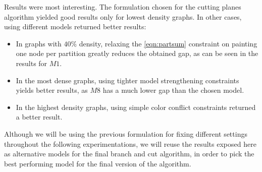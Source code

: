 Results were most interesting. The formulation chosen for the cutting planes algorithm yielded good results only for lowest density graphs. In other cases, using different models returned better results:
\begin{itemize}
\item In graphs with $40\%$ density, relaxing the \ref{eqn:partsum} constraint on painting one node per partition greatly reduces the obtained gap, as can be seen in the results for $M1$.
\item In the most dense graphs, using tighter model strengthening constraints yields better results, as $M8$ has a much lower gap than the chosen model.
\item In the highest density graphs, using simple color conflict constraints returned a better result.
\end{itemize}

Although we will be using the previous formulation for fixing different settings throughout the following experimentations, we will reuse the results exposed here as alternative models for the final branch and cut algorithm, in order to pick the best performing model for the final version of the algorithm.

\clearpage